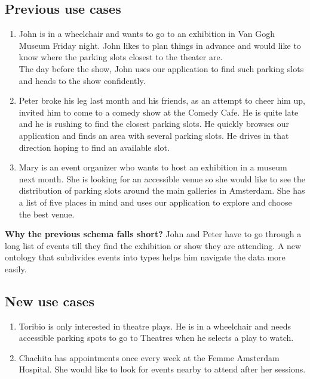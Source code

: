 \documentclass[runningheads,a4paper]{../../StyleFiles/llncs}
\begin{document}
\subsection{Previous use cases}
\begin{enumerate}
	\item John is in a wheelchair and wants to go to an exhibition in Van Gogh Museum Friday night. John likes to plan things in advance and would like to know where the parking slots closest to the theater are. \\
	The day before the show, John uses our application to find such parking slots and heads to the show confidently. 
	\item Peter broke his leg last month and his friends, as an attempt to cheer him up, invited him to come to a comedy show at the Comedy Cafe. He is quite late and he is rushing to find the closest parking slots. He quickly browses our application and finds an area with several parking slots. He drives in that direction hoping to find an available slot. 
	\item Mary is an event organizer who wants to host an exhibition in a museum next month. She is looking for an accessible venue so she would like to see the distribution of parking slots around the main galleries in Amsterdam. She has a list of five places in mind and uses our application to explore and choose the best venue.
\end{enumerate}

\textbf{Why the previous schema falls short?}
John and Peter have to go through a long list of events till they find the exhibition or show they are attending. A new ontology that subdivides events into types helps him navigate the data more easily. 

\subsection{New use cases}

\begin{enumerate}
	\item Toribio is only interested in theatre plays. He is in a wheelchair and needs accessible parking spots to go to Theatres when he selects a play to watch. 
	\item Chachita has appointments once every week at the Femme Amsterdam Hospital. She would like to look for events nearby to attend after her sessions. 
\end{enumerate}
\end{document}
